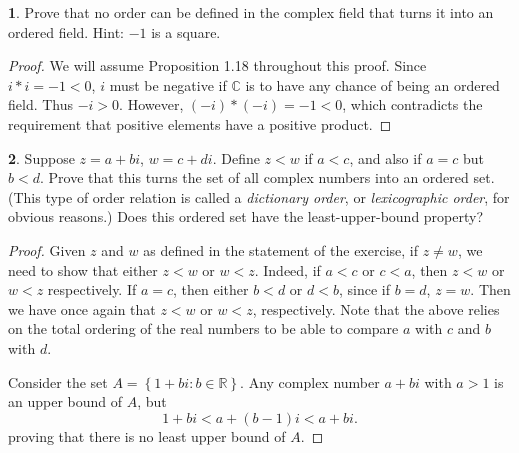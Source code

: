 \documentclass[12pt]{article}
\theoremstyle{definition}
\newtheorem{ex}{}
\begin{document}
\begin{ex}
	Prove that no order can be defined in the complex field that turns it into an ordered field.
	Hint: $-1$ is a square.
\end{ex}
\begin{proof}
	We will assume Proposition 1.18 throughout this proof.
	Since $i*i = -1 < 0$, $i$ must be negative if $\mathbb{C}$ is to have any chance of being an ordered field.
	Thus $-i > 0$.
	However, $(-i) * (-i) = -1 < 0$, which contradicts the requirement that positive elements have a positive product.
\end{proof}

\begin{ex}
	Suppose $z = a + bi$, $w = c + di$.
	Define $z < w$ if $a < c$, and also if $a = c$ but $b < d$.
	Prove that this turns the set of all complex numbers into an ordered set.
	(This type of order relation is called a \textit{dictionary order}, or \textit{lexicographic order}, for obvious reasons.)
	Does this ordered set have the least-upper-bound property?
\end{ex}
\begin{proof}
	Given $z$ and $w$ as defined in the statement of the exercise, if $z \neq w$, we need to show that either $z < w$ or $w < z$.
	Indeed, if $a < c$ or $c < a$, then $z < w$ or $w < z$ respectively.
	If $a = c$, then either $b < d$ or $d < b$, since if $b = d$, $z = w$.
	Then we have once again that $z < w$ or $w < z$, respectively.
	Note that the above relies on the total ordering of the real numbers to be able to compare $a$ with $c$ and $b$ with $d$.

	Consider the set $A = \left\lbrace 1 + bi : b \in \mathbb{R} \right\rbrace$.
	Any complex number $a + bi$ with $a > 1$ is an upper bound of $A$, but \begin{equation*}
		1 + bi < a + (b - 1)i < a + bi.
	\end{equation*} proving that there is no least upper bound of $A$.
\end{proof}
\end{document}
